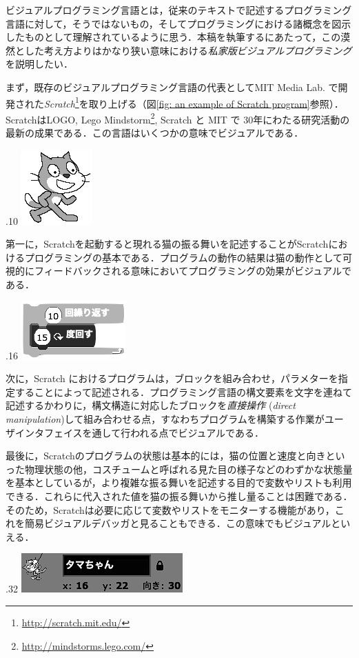 \documentclass [11pt] {jsarticle}
\begin{document}
ビジュアルプログラミング言語とは，従来のテキストで記述するプログラミング言語に対して，そうではないもの，そしてプログラミングにおける諸概念を図示したものとして理解されているように思う．本稿を執筆するにあたって，この漠然とした考え方よりはかなり狭い意味における\emph {私家版ビジュアルプログラミング}を説明したい．

まず，既存のビジュアルプログラミング言語の代表としてMIT Media Lab. で開発された\emph {Scratch}\cite {esnick09Scratch:-Programming-for-All}\footnote {\url {http://scratch.mit.edu/}}を取り上げる（図\ref {fig: an example of Scratch program}参照）．ScratchはLOGO\cite {Papert80Mindstorms:-children-computers}, Lego Mindstorm\footnote {\url {http://mindstorms.lego.com/}}, Scratch と MIT で 30年にわたる研究活動の最新の成果である．この言語はいくつかの意味でビジュアルである．

\begin {floatingfigure}[r]{.10\linewidth}
\includegraphics [height=7ex] {figs/scratch-sprite.png}
\end {floatingfigure}
第一に，Scratchを起動すると現れる猫の振る舞いを記述することがScratchにおけるプログラミングの基本である．プログラムの動作の結果は猫の動作として可視的にフィードバックされる意味においてプログラミングの効果がビジュアルである．

\begin {floatingfigure}[r]{.16\linewidth}
\includegraphics [height=7ex] {figs/scratch-block.png}
\end {floatingfigure}
次に，Scratch におけるプログラムは，ブロックを組み合わせ，パラメターを指定することによって記述される．プログラミング言語の構文要素を文字を連ねて記述するかわりに，構文構造に対応したブロックを\emph {直接操作} (\emph {direct manipulation})して組み合わせる点，すなわちプログラムを構築する作業がユーザインタフェイスを通して行われる点でビジュアルである．

最後に，Scratchのプログラムの状態は基本的には，猫の位置と速度と向きといった物理状態の他，コスチュームと呼ばれる見た目の様子などのわずかな状態量を基本としているが，より複雑な振る舞いを記述する目的で変数やリストも利用できる．これらに代入された値を猫の振る舞いから推し量ることは困難である．そのため，Scratchは必要に応じて変数やリストをモニターする機能があり，これを簡易ビジュアルデバッガと見ることもできる．この意味でもビジュアルといえる．
\begin {floatingfigure}[r]{.32\linewidth}
\includegraphics [height=7ex] {figs/scratch-state.png}
\end {floatingfigure}
\end{document}
